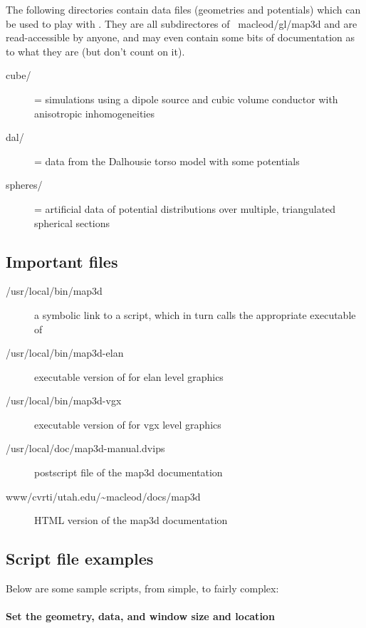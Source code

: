 The following directories contain data files (geometries and potentials)
which can be used to play with \map{}.  They are all subdirectores of
~macleod/gl/map3d and are read-accessible by anyone, and may even contain some
bits of documentation as to what they are (but don't count on it).

\begin{description}
  \item[cube/] = simulations using a dipole source and cubic volume
        conductor with anisotropic inhomogeneities
  \item[dal/] = data from the Dalhousie torso model with some
        potentials
  \item[spheres/] = artificial data of potential distributions
        over multiple, triangulated spherical sections
        
\end{description}

\subsection{Important files}

\begin{description}
  \item[/usr/local/bin/map3d] a symbolic link to a script, which in turn
        calls the appropriate executable of \map{}
  \item [/usr/local/bin/map3d-elan] executable version of \map{} for elan
        level graphics 
  \item [/usr/local/bin/map3d-vgx] executable version of \map{} for vgx
        level graphics 
  \item [/usr/local/doc/map3d-manual.dvips] postscript file of the map3d
        documentation 
  \item [www/cvrti/utah.edu/\~{}macleod/docs/map3d] HTML version of the map3d
        documentation 
\end{description}


\subsection{Script file examples}
\label{sec:examplescripts} 

Below are some sample scripts, from simple, to fairly complex:

\paragraph{Set the geometry, data, and window size and location}

